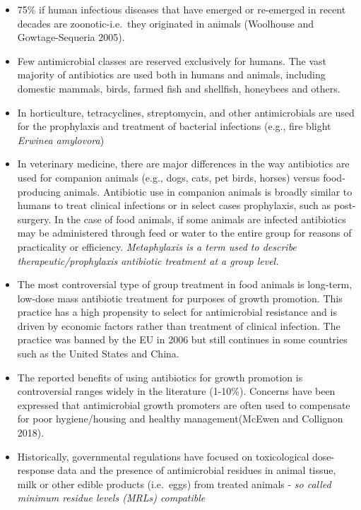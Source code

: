 \documentclass[]{tufte-handout}
\providecommand{\tightlist}{%
  \setlength{\itemsep}{0pt}\setlength{\parskip}{0pt}}
\begin{document}
\begin{itemize}
\tightlist
\item
  75\% if human infectious diseases that have emerged or re-emerged in
  recent decades are zoonotic-i.e.~they originated in animals (Woolhouse
  and Gowtage-Sequeria 2005).
\item
  Few antimicrobial classes are reserved exclusively for humans. The
  vast majority of antibiotics are used both in humans and animals,
  including domestic mammals, birds, farmed fish and shellfish,
  honeybees and others.
\item
  In horticulture, tetracyclines, streptomycin, and other antimicrobials
  are used for the prophylaxis and treatment of bacterial infections
  (e.g., fire blight \emph{Erwinea amylovora})
\item
  In veterinary medicine, there are major differences in the way
  antibiotics are used for companion animals (e.g., dogs, cats, pet
  birds, horses) versus food-producing animals. Antibiotic use in
  companion animals is broadly similar to humans to treat clinical
  infections or in select cases prophylaxis, such as post-surgery. In
  the case of food animals, if some animals are infected antibiotics may
  be administered through feed or water to the entire group for reasons
  of practicality or efficiency. \emph{Metaphylaxis is a term used to
  describe therapeutic/prophylaxis antibiotic treatment at a group
  level.}
\item
  The most controversial type of group treatment in food animals is
  long-term, low-dose mass antibiotic treatment for purposes of growth
  promotion. This practice has a high propensity to select for
  antimicrobial resistance and is driven by economic factors rather than
  treatment of clinical infection. The practice was banned by the EU in
  2006 but still continues in some countries such as the United States
  and China.
\item
  The reported benefits of using antibiotics for growth promotion is
  controversial ranges widely in the literature (1-10\%). Concerns have
  been expressed that antimicrobial growth promoters are often used to
  compensate for poor hygiene/housing and healthy management(McEwen and
  Collignon 2018).
\item
  Historically, governmental regulations have focused on toxicological
  dose-response data and the presence of antimicrobial residues in
  animal tissue, milk or other edible products (i.e.~eggs) from treated
  animals - \emph{so called minimum residue levels (MRLs) compatible
}
\end{itemize}
\end{document}
